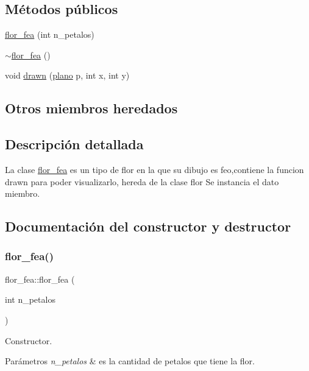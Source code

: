 \subsection*{Métodos públicos}
\begin{DoxyCompactItemize}
\item 
\hyperlink{classflor__fea_a617be6f164203d33d5f6da3926951d65}{flor\+\_\+fea} (int n\+\_\+petalos)
\item 
\hyperlink{classflor__fea_afafbf5440bec15a1fde668e1be42d42e}{$\sim$flor\+\_\+fea} ()
\item 
void \hyperlink{classflor__fea_af4ee97eef5e4ac46e5fbafb737759c3b}{drawn} (\hyperlink{classplano}{plano} p, int x, int y)
\end{DoxyCompactItemize}
\subsection*{Otros miembros heredados}


\subsection{Descripción detallada}
La clase \hyperlink{classflor__fea}{flor\+\_\+fea} es un tipo de flor en la que su dibujo es feo,contiene la funcion drawn para poder visualizarlo, hereda de la clase flor  Se instancia el dato miembro. 

\subsection{Documentación del constructor y destructor}
\mbox{\label{classflor__fea_a617be6f164203d33d5f6da3926951d65}} 
\subsubsection{\texorpdfstring{flor\+\_\+fea()}{flor\_fea()}}
{\footnotesize\ttfamily flor\+\_\+fea\+::flor\+\_\+fea (\begin{DoxyParamCaption}\item[{int}]{n\+\_\+petalos }\end{DoxyParamCaption})}

Constructor. 
\begin{DoxyParams}{Parámetros}
{\em n\+\_\+petalos} & es la cantidad de petalos que tiene la flor. \\
\hline
\end{DoxyParams}
\mbox{\label{classflor__fea_afafbf5440bec15a1fde668e1be42d42e}} 
